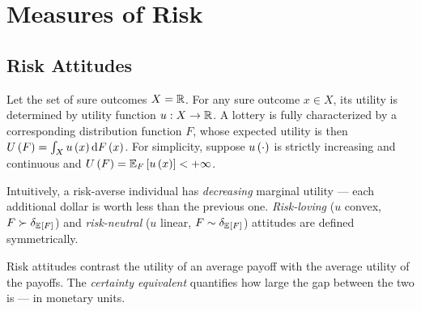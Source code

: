 \section{Measures of Risk}\label{measures-of-risk}

\subsection{Risk Attitudes}\label{risk-attitudes}

Let the set of sure outcomes \(X = \RR\). For any sure outcome $x\in X$, its utility is determined by utility function $u:X\to \RR$. A lottery is fully characterized by a corresponding distribution function \(F\), whose expected utility is then 
\(U\pr{F} = \int_Xu\pr{x}\text d F\pr{x}\). For simplicity, suppose
\(u\pr{\cdot}\) is strictly increasing and continuous and
\(U\pr{F} = \E[F]{u\pr{x}}<+\infty\).




Intuitively, a risk-averse individual has \emph{decreasing} marginal
utility — each additional dollar is worth less than the previous one.
\emph{Risk-loving} (\(u\) convex, \(F\succ\delta_{\E F}\)) and
\emph{risk-neutral} (\(u\) linear, \(F\sim\delta_{\E F}\)) attitudes are
defined symmetrically.

Risk attitudes contrast the utility of an average payoff with the
average utility of the payoffs. The \emph{certainty equivalent}
quantifies how large the gap between the two is — in monetary units.


